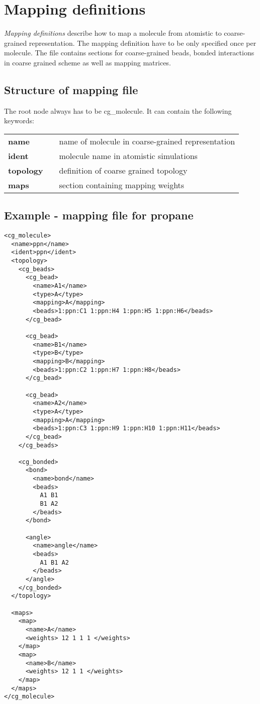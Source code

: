 \section{Mapping definitions}
{\em Mapping definitions} describe how to map a molecule from atomistic to coarse-grained representation. The mapping definition have to be only specified once per molecule. The file contains sections for coarse-grained beads, bonded interactions in coarse grained scheme as well as mapping matrices. 

\subsection{Structure of mapping file}
The root node always has to be cg\_molecule. It can contain the following keywords:

\begin{tabular}{lcl}
  \textbf{name} &  & name of molecule in coarse-grained representation \\
  \textbf{ident} &  & molecule name in atomistic simulations \\
  \textbf{topology} &  & definition of coarse grained topology \\
  \textbf{maps} &  & section containing mapping weights
\end{tabular}

\subsection{Example - mapping file for propane}

\begin{lstlisting}
<cg_molecule>
  <name>ppn</name>
  <ident>ppn</ident>
  <topology>
    <cg_beads>
      <cg_bead>
        <name>A1</name>
        <type>A</type>
        <mapping>A</mapping>
        <beads>1:ppn:C1 1:ppn:H4 1:ppn:H5 1:ppn:H6</beads>
      </cg_bead>

      <cg_bead>
        <name>B1</name>
        <type>B</type>
        <mapping>B</mapping>
        <beads>1:ppn:C2 1:ppn:H7 1:ppn:H8</beads>
      </cg_bead>

      <cg_bead>
        <name>A2</name>
        <type>A</type>
        <mapping>A</mapping>
        <beads>1:ppn:C3 1:ppn:H9 1:ppn:H10 1:ppn:H11</beads>
      </cg_bead>
    </cg_beads>

    <cg_bonded>
      <bond>
        <name>bond</name>
        <beads>
          A1 B1
          B1 A2
        </beads>
      </bond>

      <angle>
        <name>angle</name>
        <beads>
          A1 B1 A2
        </beads>
      </angle>
    </cg_bonded>
  </topology>

  <maps>
    <map>
      <name>A</name>
      <weights> 12 1 1 1 </weights>
    </map>
    <map>
      <name>B</name>
      <weights> 12 1 1 </weights>
    </map>
  </maps>
</cg_molecule>
\end{lstlisting}